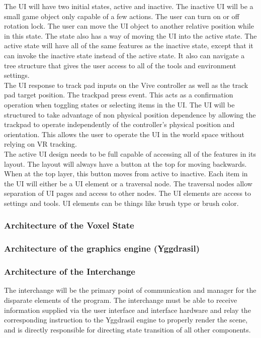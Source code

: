 \documentclass[onecolumn, draftclsnofoot,10pt, compsoc]{IEEEtran}
\begin{document}
The UI will have two initial states, active and inactive. The inactive UI will be a small game object only capable of a few actions. The user can turn on or off rotation lock. The user can move the UI object to another relative position while in this state. The state also has a way of moving the UI into the active state. 
The active state will have all of the same features as the inactive state, except that it can invoke the inactive state instead of the active state. It also can navigate a tree structure that gives the user access to all of the tools and environment settings. \\

The UI response to track pad inputs on the Vive controller as well as the track pad target position. The trackpad press event. This acts as a confirmation operation when toggling states or selecting items in the UI. The UI will be structured to take advantage of non physical position dependence by allowing the trackpad to operate independently of the controller's physical position and orientation. This allows the user to operate the UI in the world space without relying on VR tracking. \\

The active UI design needs to be full capable of accessing all of the features in its layout. The layout will always have a button at the top for moving backwards. When at the top layer, this button moves from active to inactive. Each item in the UI will either be a UI element or a traversal node. The traversal nodes allow separation of UI pages and access to other nodes. The UI elements are access to settings and tools. UI elements can be things like brush type or brush color. \\

\subsubsection{Architecture of the Voxel State}

\subsubsection{Architecture of the graphics engine (Yggdrasil)}

\subsubsection{Architecture of the Interchange}
The interchange will be the primary point of communication and manager for the disparate elements of the program. The interchange must be able to receive information supplied via the user interface and interface hardware and relay the corresponding instruction to the Yggdrasil engine to properly render the scene, and is directly responsible for directing state transition of all other components.
\end{document}
